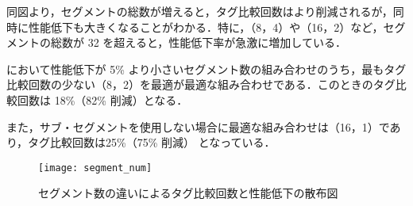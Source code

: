 同図より，セグメントの総数が増えると，タグ比較回数はより削減されるが，同時に性能低下も大きくなることがわかる．特に，（8，4）や（16，2）など，セグメントの総数が 32 を超えると，性能低下率が急激に増加している．

において性能低下が 5\% より小さいセグメント数の組み合わせのうち，最もタグ比較回数の少ない（8，2）を最適が最適な組み合わせである．このときのタグ比較回数は 18\%（82\% 削減）となる．

また，サブ・セグメントを使用しない場合に最適な組み合わせは（16，1）であり，タグ比較回数は25\%（75\% 削減） となっている．

\begin{figure}[htb]
  \centering
  \texttt{[image: segment\_num]}
  \caption{セグメント数の違いによるタグ比較回数と性能低下の散布図}
  \label{fig:segment_num}
\end{figure}
